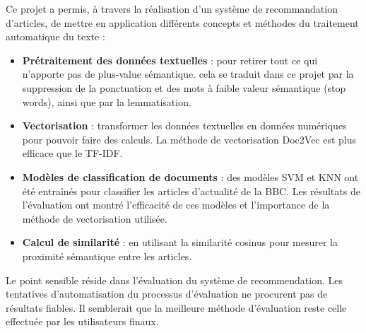 \documentclass[a4paper,12pt]{article}
\begin{document}
Ce projet a permis, à travers la réalisation d'un système de recommandation d'articles, de mettre en application différents concepts et méthodes du traitement automatique du texte :
\begin{itemize}
    \item \textbf{Prétraitement des données textuelles} : pour retirer tout ce qui n'apporte pas de plus-value sémantique. cela se traduit dans ce projet par la suppression de la ponctuation et des mots à faible valeur sémantique (stop words), ainsi que par la lemmatisation.
    \item \textbf{Vectorisation} : transformer les données textuelles en données numériques pour pouvoir faire des calculs. La méthode de vectorisation Doc2Vec est plus efficace que le TF-IDF.
    \item \textbf{Modèles de classification de documents} : des modèles SVM et KNN ont été entraînés pour classifier les articles d'actualité de la BBC. Les résultats de l'évaluation ont montré l'efficacité de ces modèles et l'importance de la méthode de vectorisation utilisée.
    \item \textbf{Calcul de similarité} : en utilisant la similarité cosinus pour mesurer la proximité sémantique entre les articles.
\end{itemize}

Le point sensible réside dans l'évaluation du système de recommendation. Les tentatives d'automatisation du processus d'évaluation ne procurent pas de résultats fiables. Il semblerait que la meilleure méthode d'évaluation reste celle effectuée par les utilisateurs finaux.



\newpage

\printbibliography[
heading=bibintoc,
title={Références}
]
\end{document}
